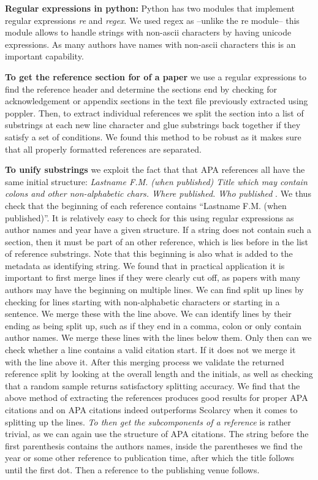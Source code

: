 \documentclass[journal,twocolumn]{IEEEtran}
\begin{document}
\textbf{Regular expressions in python:} Python has two modules that
implement regular expressions \emph{re} and \emph{regex}. We used regex
as --unlike the re module-- this module allows to handle strings with
non-ascii characters by having unicode expressions. As many authors have
names with non-ascii characters this is an important capability.

\textbf{To get the reference section for of a paper} we use a regular
expressions to find the reference header and determine the sections end
by checking for acknowledgement or appendix sections in the text file
previously extracted using poppler. Then, to extract individual
references we split the section into a list of substrings at each new
line character and glue substrings back together if they satisfy a set
of conditions. We found this method to be robust as it makes sure that
all properly formatted references are separated.

\textbf{To unify substrings} we exploit the fact that that APA
references all have the same initial structure: \emph{Lastname F.M.
(when published) Title which may contain colons and other non-alphabetic
chars. Where published. Who published} \cite{apaformat}. We thus check
that the beginning of each reference contains ``Lastname F.M. (when
published)''. It is relatively easy to check for this using regular
expressions as author names and year have a given structure. If a string
does not contain such a section, then it must be part of an other
reference, which is lies before in the list of reference substrings.
Note that this beginning is also what is added to the metadata as
identifying string. We found that in practical application it is
important to first merge lines if they were clearly cut off, as papers
with many authors may have the beginning on multiple lines. We can find
split up lines by checking for lines starting with non-alphabetic
characters or starting in a sentence. We merge these with the line
above. We can identify lines by their ending as being split up, such as
if they end in a comma, colon or only contain author names. We merge
these lines with the lines below them. Only then can we check whether a
line contains a valid citation start. If it does not we merge it with
the line above it. After this merging process we validate the returned
reference split by looking at the overall length and the initials, as
well as checking that a random sample returns satisfactory splitting
accuracy. We find that the above method of extracting the references
produces good results for proper APA citations and on APA citations
indeed outperforms Scolarcy when it comes to splitting up the lines.
\emph{To then get the subcomponents of a reference} is rather trivial,
as we can again use the structure of APA citations. The string before
the first parenthesis contains the authors names, inside the parentheses
we find the year or some other reference to publication time, after
which the title follows until the first dot. Then a reference to the
publishing venue follows.
\end{document}
